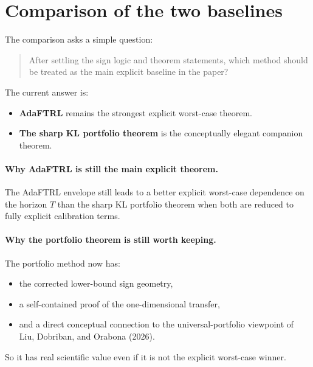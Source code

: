 \documentclass[11pt]{article}
\newcommand{\1}{\mathbf{1}}
\begin{document}
\section{Comparison of the two baselines}
\label{sec:comparison}

The comparison asks a simple question:

\begin{quote}
After settling the sign logic and theorem statements, which method should be treated as the main explicit baseline in the paper?
\end{quote}

The current answer is:

\begin{itemize}[leftmargin=*,itemsep=2pt]
  \item \textbf{AdaFTRL} remains the strongest explicit worst-case theorem.
  \item \textbf{The sharp KL portfolio theorem} is the conceptually elegant companion theorem.
\end{itemize}

\paragraph{Why AdaFTRL is still the main explicit theorem.}
The AdaFTRL envelope still leads to a better explicit worst-case dependence on the horizon \(T\) than the sharp KL portfolio theorem when both are reduced to fully explicit calibration terms.

\paragraph{Why the portfolio theorem is still worth keeping.}
The portfolio method now has:
\begin{itemize}[leftmargin=*,itemsep=2pt]
  \item the corrected lower-bound sign geometry,
  \item a self-contained proof of the one-dimensional transfer,
  \item and a direct conceptual connection to the universal-portfolio viewpoint of Liu, Dobriban, and Orabona (2026).
\end{itemize}
So it has real scientific value even if it is not the explicit worst-case winner.
\end{document}

